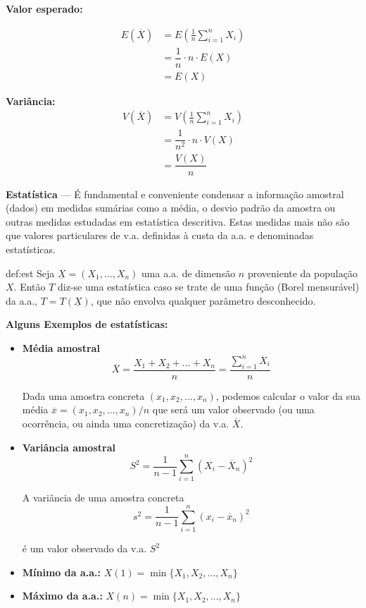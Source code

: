 {

\begin{mdframed}
   \noindent \textbf{Valor esperado:}

    $$
        \begin{aligned}
            E(\overline{X}) &= E\left(\frac{1}{n}\sum_{i=1}^n X_i\right)\\
            &= \dfrac{1}{n} \cdot n \cdot E(X)\\
            &= E(X)
        \end{aligned}
    $$

    \noindent \textbf{Variância:}
    $$
        \begin{aligned}
            V(\overline{X}) &= V\left(\frac{1}{n}\sum_{i=1}^n X_i\right)\\
            &= \dfrac{1}{n^2} \cdot n \cdot V(X)\\[4pt]
            &= \dfrac{V(X)}{n}
        \end{aligned}
    $$
\end{mdframed}
}

\noindent\textbf{Estatística} --- É fundamental e conveniente condensar a informação amostral (dados) em medidas sumárias como a média, o desvio padrão da amostra ou outras medidas estudadas em estatística descritiva. Estas medidas mais não são que valores particulares de v.a. definidas à custa da a.a. e denominadas estatísticas.

\newpage
\begin{theo}{def:est}\label{def:esst}
    \noindent Seja $\underline{X} = (X_1, \dots, X_n)$ uma a.a. de dimensão $n$ proveniente da população $X$. Então $T$ diz-se uma estatística caso se trate de uma função (Borel mensurável) da a.a., $T = T(\underline{X})$, que não envolva qualquer parâmetro desconhecido.
\end{theo}

\noindent \textbf{Alguns Exemplos de estatísticas:}
\begin{itemize}
    \item \textbf{Média amostral}
    $$
        \overline{X} = \dfrac{X_1 + X_2 + \dots + X_n}{n} = \dfrac{\sum_{i = 1}^n X_i}{n}
    $$

    \noindent Dada uma amostra concreta $(x_1, x_2, \dots, x_n)$, podemos calcular o valor da sua média $\overline{x} = (x_1, x_2, \dots, x_n)/n$ que será um valor observado (ou uma ocorrência, ou ainda uma concretização) da v.a. $\overline{X}$.

    \item \textbf{Variância amostral}
    $$
        S^2 = \dfrac{1}{n - 1}\sum_{i = 1}^n (X_i - \overline{X}_n)^2
    $$

    A variância de uma amostra concreta 
    $$
        s^2 = \dfrac{1}{n - 1}\sum_{i = 1}^n (x_i - \overline{x}_n)^2
    $$

    é um valor observado da v.a. $S^2$

    \item \textbf{Mínimo da a.a.:} $X(1) = \min\{X_1, X_2,\dots, X_n\}$ 
    \item \textbf{Máximo da a.a.:} $X(n) = \min\{X_1, X_2,\dots, X_n\}$
\end{itemize}
